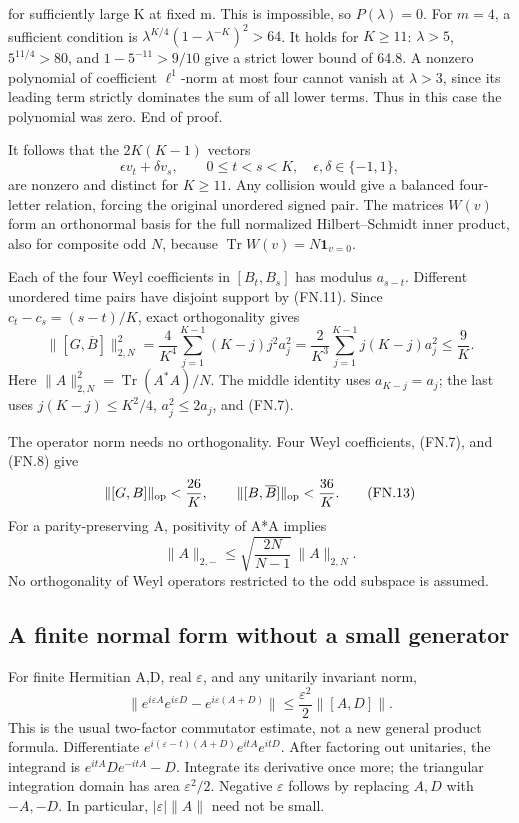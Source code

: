 \] for sufficiently large K at fixed m. This is impossible, so \(P(\lambda)=0\). For \(m=4\), a sufficient condition is \(\lambda^{K/4}(1-\lambda^{-K})^2>64\). It holds for \(K\geq11\): \(\lambda>5\), \(5^{11/4}>80\), and \(1-5^{-11}>9/10\) give a strict lower bound of 64.8. A nonzero polynomial of coefficient \(\ell^1\)-norm at most four cannot vanish at \(\lambda>3\), since its leading term strictly dominates the sum of all lower terms. Thus in this case the polynomial was zero. End of proof.

It follows that the \(2K(K-1)\) vectors \[
 \epsilon v_t+\delta v_s,\qquad 0\leq t<s<K,\quad
 \epsilon,\delta\in\{-1,1\},                                  \tag{FN.11}
\] are nonzero and distinct for \(K\geq11\). Any collision would give a balanced four-letter relation, forcing the original unordered signed pair. The matrices \(W(v)\) form an orthonormal basis for the full normalized Hilbert--Schmidt inner product, also for composite odd \(N\), because \(\operatorname{Tr}W(v)=N\mathbf1_{v=0}\).

Each of the four Weyl coefficients in \([B_t,B_s]\) has modulus \(a_{s-t}\). Different unordered time pairs have disjoint support by (FN.11). Since \(c_t-c_s=(s-t)/K\), exact orthogonality gives \[
 \|[G,\overline B]\|_{2,N}^2
 =\frac4{K^4}\sum_{j=1}^{K-1}(K-j)j^2a_j^2
 =\frac2{K^3}\sum_{j=1}^{K-1}j(K-j)a_j^2
 \leq\frac9K.                                                  \tag{FN.12}
\] Here \(\|A\|_{2,N}^2=\operatorname{Tr}(A^*A)/N\). The middle identity uses \(a_{K-j}=a_j\); the last uses \(j(K-j)\leq K^2/4\), \(a_j^2\leq2a_j\), and (FN.7).

The operator norm needs no orthogonality. Four Weyl coefficients, (FN.7), and (FN.8) give \[
 \|[G,B]\|_{\rm op}<\frac{26}{K},\qquad
 \|[B,\overline B]\|_{\rm op}<\frac{36}{K}.                     \tag{FN.13}
\] For a parity-preserving A, positivity of A*A implies \[
 \|A\|_{2,-}\leq\sqrt{\frac{2N}{N-1}}\,\|A\|_{2,N}.             \tag{FN.14}
\] No orthogonality of Weyl operators restricted to the odd subspace is assumed.

\subsection{A finite normal form without a small generator}\label{floquet:a-finite-normal-form-without-a-small-generator}

For finite Hermitian A,D, real \(\varepsilon\), and any unitarily invariant norm, \[
 \|e^{i\varepsilon A}e^{i\varepsilon D}
           -e^{i\varepsilon(A+D)}\|
 \leq\frac{\varepsilon^2}{2}\|[A,D]\|.                          \tag{FN.15}
\] This is the usual two-factor commutator estimate, not a new general product formula. Differentiate \(e^{i(\varepsilon-t)(A+D)}e^{itA}e^{itD}\). After factoring out unitaries, the integrand is \(e^{itA}De^{-itA}-D\). Integrate its derivative once more; the triangular integration domain has area \(\varepsilon^2/2\). Negative \(\varepsilon\) follows by replacing \(A,D\) with \(-A,-D\). In particular, \(|\varepsilon|\|A\|\) need not be small.


